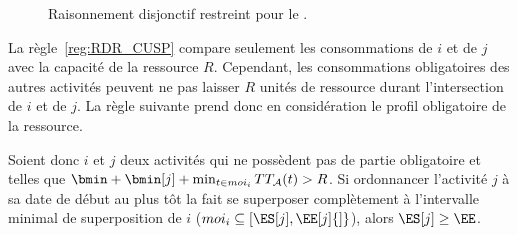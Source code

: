 \begin{ex}
\begin{figure}[htb!]
{
}
  \caption{Raisonnement disjonctif restreint pour le \CECSP.}
  \label{fig:RDR_CECSP}
\end{figure}
\end{ex}

La règle~\ref{reg:RDR_CUSP} compare seulement les consommations de $i$
et de $j$ avec la capacité de la ressource $R$. Cependant, les
consommations obligatoires des autres activités peuvent ne pas laisser
$R$ unités de ressource durant l'intersection de $i$ et de $j$. La
règle suivante prend donc en considération le profil obligatoire de la
ressource. 

\begin{reg}
\label{reg:TTDR_CUSP}
Soient donc $i$ et $j$ deux activités qui ne possèdent pas de partie
obligatoire et telles que $ \bmin +\bmin[j] + \min_{t \in moi_i} TT_{\A}(t) >
R$.   Si ordonnancer l'activité
 $j$ à sa date de début au plus tôt la fait se superposer complètement
 à l’intervalle minimal de superposition de $i$ ($moi_i \subseteq
 [\ES[j],\EE[j]{]}$), alors $\ES[j] \ge \EE$.
\end{reg}

